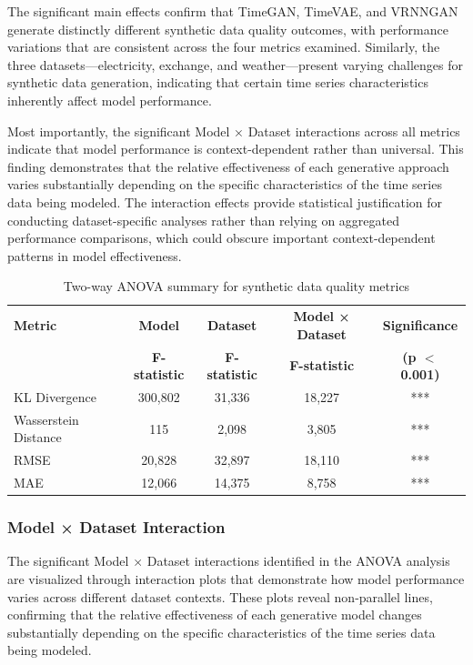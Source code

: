 \documentclass[11pt]{article}
\begin{document}
The significant main effects confirm that TimeGAN, TimeVAE, and VRNNGAN generate distinctly different synthetic data quality outcomes, with performance variations that are consistent across the four metrics examined. Similarly, the three datasets—electricity, exchange, and weather—present varying challenges for synthetic data generation, indicating that certain time series characteristics inherently affect model performance.

Most importantly, the significant Model × Dataset interactions across all metrics indicate that model performance is context-dependent rather than universal. This finding demonstrates that the relative effectiveness of each generative approach varies substantially depending on the specific characteristics of the time series data being modeled. The interaction effects provide statistical justification for conducting dataset-specific analyses rather than relying on aggregated performance comparisons, which could obscure important context-dependent patterns in model effectiveness.

\begin{table}[H]
\centering
\caption{Two-way ANOVA summary for synthetic data quality metrics}
\label{tab:anova_summary}
\begin{tabular}{lcccc}
\toprule
\textbf{Metric} & \textbf{Model} & \textbf{Dataset} & \textbf{Model × Dataset} & \textbf{Significance} \\
 & \textbf{F-statistic} & \textbf{F-statistic} & \textbf{F-statistic} & \textbf{(p $<$ 0.001)} \\
\midrule
KL Divergence & 300,802 & 31,336 & 18,227 & *** \\
Wasserstein Distance & 115 & 2,098 & 3,805 & *** \\
RMSE & 20,828 & 32,897 & 18,110 & *** \\
MAE & 12,066 & 14,375 & 8,758 & *** \\
\bottomrule
\end{tabular}
\end{table}



\subsubsection{Model × Dataset Interaction}

The significant Model × Dataset interactions identified in the ANOVA analysis are visualized through interaction plots that demonstrate how model performance varies across different dataset contexts. These plots reveal non-parallel lines, confirming that the relative effectiveness of each generative model changes substantially depending on the specific characteristics of the time series data being modeled.
\end{document}
